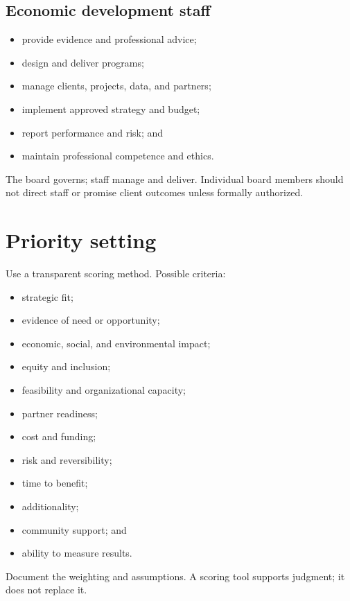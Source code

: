 \documentclass[11pt,letterpaper,oneside,openany]{book}
\begin{document}
\subsection[Economic development staff]{Economic development staff}
\begin{itemize}
\item provide evidence and professional advice;
\item design and deliver programs;
\item manage clients, projects, data, and partners;
\item implement approved strategy and budget;
\item report performance and risk; and
\item maintain professional competence and ethics.
\end{itemize}


The board governs; staff manage and deliver. Individual board members should not direct staff or promise client outcomes unless formally authorized.


\section[Priority setting]{Priority setting}
Use a transparent scoring method. Possible criteria:


\begin{itemize}
\item strategic fit;
\item evidence of need or opportunity;
\item economic, social, and environmental impact;
\item equity and inclusion;
\item feasibility and organizational capacity;
\item partner readiness;
\item cost and funding;
\item risk and reversibility;
\item time to benefit;
\item additionality;
\item community support; and
\item ability to measure results.
\end{itemize}


Document the weighting and assumptions. A scoring tool supports judgment; it does not replace it.


\end{document}
